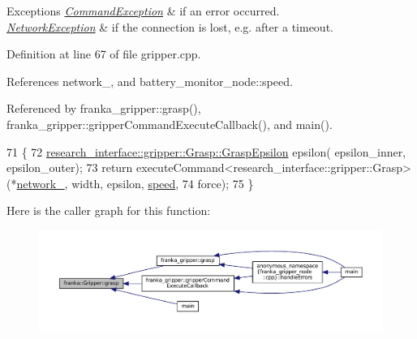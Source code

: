 \begin{DoxyExceptions}{Exceptions}
{\em \hyperlink{structfranka_1_1CommandException}{Command\+Exception}} & if an error occurred. \\
\hline
{\em \hyperlink{structfranka_1_1NetworkException}{Network\+Exception}} & if the connection is lost, e.\+g. after a timeout. \\
\hline
\end{DoxyExceptions}


Definition at line 67 of file gripper.\+cpp.



References network\+\_\+, and battery\+\_\+monitor\+\_\+node\+::speed.



Referenced by franka\+\_\+gripper\+::grasp(), franka\+\_\+gripper\+::gripper\+Command\+Execute\+Callback(), and main().


\begin{DoxyCode}
71                                                 \{
72   \hyperlink{structresearch__interface_1_1gripper_1_1Grasp_1_1GraspEpsilon}{research\_interface::gripper::Grasp::GraspEpsilon} epsilon(
      epsilon\_inner, epsilon\_outer);
73   \textcolor{keywordflow}{return} executeCommand<research\_interface::gripper::Grasp>(*\hyperlink{classfranka_1_1Gripper_a0d6702c45e61147da44b08dd757890df}{network\_}, width, epsilon, 
      \hyperlink{namespacebattery__monitor__node_a78ba7243610b635b1712c5af728edc13}{speed},
74                                                             force);
75 \}
\end{DoxyCode}
Here is the caller graph for this function\+:
\nopagebreak
\begin{figure}[H]
\begin{center}
\leavevmode
\includegraphics[width=350pt]{classfranka_1_1Gripper_abff6a03a6c75b9079bd4b9b5ca380254_icgraph}
\end{center}
\end{figure}
\mbox{\label{classfranka_1_1Gripper_aef356f93a4c3b9d6b2532c29126d478c}} 
